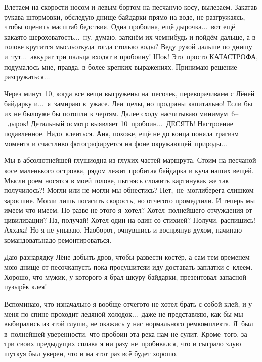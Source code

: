 Влетаем на скорости носом и левым бортом на песчаную косу, вылезаем. Закатав рукава штормовки, обследую днище байдарки прямо на воде, не разгружаясь, чтобы оценить масштаб бедствия. Одна пробоина, ещё дырочка$\ldots$~вот ещё какая\sdash то шероховатость$\ldots$~ну, думаю, заткнём их чем\sdash нибудь и пойдём дальше, а в голове крутится мысль\mdash откуда тогда столько воды? Веду рукой дальше по днищу и~тут$\ldots$~аккурат три пальца входят в пробоину! Шок! Это~просто КАТАСТРОФА, подумалось мне, правда, в более крепких выражениях. Принимаю решение разгружаться$\ldots$

Через минут 10, когда все вещи выгружены на~песочек, переворачиваем с Лёней байдарку и$\ldots$~я~замираю в~ужасе. Леи~целы, но продраны капитально! Если бы их не было\mdash уже бы потопли к чертям. Далее сходу насчитываю минимум~6\thinspace--~дырок! Детальный осмотр выявляет 10~пробоин$\ldots$~ДЕСЯТЬ! Настроение подавленное. Надо~клеиться. Аня, похоже, ещё не до конца поняла трагизм момента и счастливо фотографируется на фоне окружающей~природы$\ldots$

Мы в абсолютнейшей глуши\mdash одна из глухих частей маршрута. Стоим на песчаной косе маленького островка, рядом лежит пробитая байдарка и куча наших вещей. Мысли роем носятся в моей голове, пытаясь сложить картину\mdash как же так получилось?! Могли или не могли мы обнестись? Нет,~не~могли\mdash берега слишком заросшие. Могли лишь погасить скорость, но отчего\sdash то промедлили. И теперь мы имеем что имеем. Но разве не этого я~хотел? Хотел~полнейшего отчуждения от цивилизации? На, получай! Хотел один на один со стихией? Получи, распишись! Ах\sdash ха\sdash ха! Но я не унываю. Наоборот, очнувшись и воспрянув духом, начинаю командовать\mdash надо ремонтироваться. 

Даю разнарядку Лёне добыть дров, чтобы развести костёр, а сам тем временем мою днище от песочка\mdash пусть пока просушится\mdash и иду доставать заплатки с~клеем. Хорошо, что мужик, у которого я брал шкуру байдарки, презентовал запасной пузырёк клея! 

Вспоминаю, что изначально я вообще отчего\sdash то не хотел брать с собой клей, и у меня по спине проходит ледяной холодок$\ldots$~даже не представляю, как бы мы выбирались из этой глуши, не окажись у нас нормального ремкомплекта. Я~был в~полнейшей уверенности, что пробоин эта река нам не сулит. Кроме~того, за три своих предыдущих сплава я ни разу не~пробивался, что и сыграло злую шутку\mdash я был уверен, что и на этот раз всё будет хорошо. 

